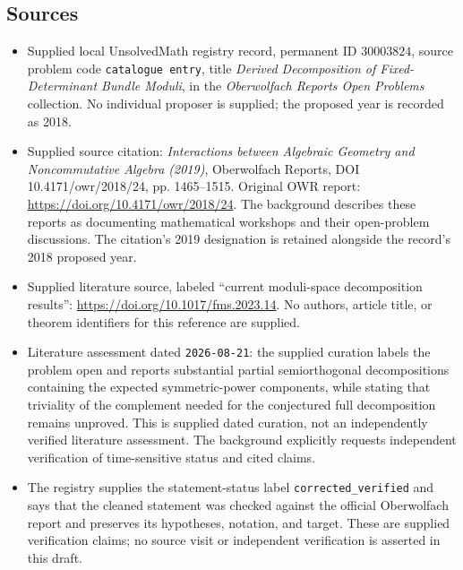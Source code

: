 \documentclass[11pt]{article}
\begin{document}
\subsection{Sources}
\begin{itemize}
\item Supplied local UnsolvedMath registry record, permanent ID \(30003824\), source problem code \texttt{catalogue entry}, title \emph{Derived Decomposition of Fixed-Determinant Bundle Moduli}, in the \emph{Oberwolfach Reports Open Problems} collection. No individual proposer is supplied; the proposed year is recorded as 2018.
\item Supplied source citation: \emph{Interactions between Algebraic Geometry and Noncommutative Algebra (2019)}, Oberwolfach Reports, DOI 10.4171/owr/2018/24, pp. 1465--1515. Original OWR report: \url{https://doi.org/10.4171/owr/2018/24}. The background describes these reports as documenting mathematical workshops and their open-problem discussions. The citation's 2019 designation is retained alongside the record's 2018 proposed year.
\item Supplied literature source, labeled ``current moduli-space decomposition results'': \url{https://doi.org/10.1017/fms.2023.14}. No authors, article title, or theorem identifiers for this reference are supplied.
\item Literature assessment dated \texttt{2026-08-21}: the supplied curation labels the problem open and reports substantial partial semiorthogonal decompositions containing the expected symmetric-power components, while stating that triviality of the complement needed for the conjectured full decomposition remains unproved. This is supplied dated curation, not an independently verified literature assessment. The background explicitly requests independent verification of time-sensitive status and cited claims.
\item The registry supplies the statement-status label \texttt{corrected\_verified} and says that the cleaned statement was checked against the official Oberwolfach report and preserves its hypotheses, notation, and target. These are supplied verification claims; no source visit or independent verification is asserted in this draft.
\end{itemize}
\end{document}
